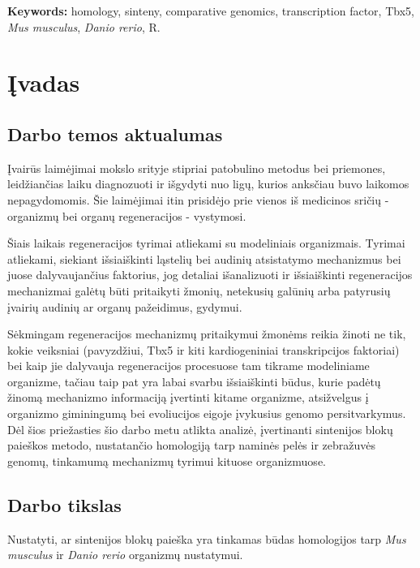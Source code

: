 \documentclass[12pt]{article}
\begin{document}
\hfill \break

\textbf{Keywords:} homology, sinteny, comparative genomics, transcription
factor, Tbx5, \emph{Mus musculus}, \emph{Danio rerio}, R.

\newpage


\section{Įvadas}
\subsection*{Darbo temos aktualumas}
Įvairūs laimėjimai mokslo srityje stipriai patobulino metodus bei priemones,
leidžiančias laiku diagnozuoti ir išgydyti nuo ligų, kurios anksčiau buvo
laikomos nepagydomomis. Šie laimėjimai itin prisidėjo prie vienos iš medicinos
sričių - organizmų bei organų regeneracijos - vystymosi.

Šiais laikais regeneracijos tyrimai atliekami su modeliniais organizmais.
Tyrimai atliekami, siekiant išsiaiškinti ląstelių bei audinių atsistatymo
mechanizmus bei juose dalyvaujančius faktorius, jog detaliai išanalizuoti ir
išsiaiškinti regeneracijos mechanizmai galėtų būti pritaikyti žmonių, netekusių
galūnių arba patyrusių įvairių audinių ar organų pažeidimus, gydymui.

Sėkmingam regeneracijos mechanizmų pritaikymui žmonėms reikia žinoti ne tik,
kokie veiksniai (pavyzdžiui, Tbx5 ir kiti kardiogeniniai transkripcijos
faktoriai) bei kaip jie dalyvauja regeneracijos procesuose tam tikrame
modeliniame organizme, tačiau taip pat yra labai svarbu išsiaiškinti būdus,
kurie padėtų žinomą mechanizmo informaciją įvertinti kitame organizme,
atsižvelgus į organizmo giminingumą bei evoliucijos eigoje įvykusius genomo
persitvarkymus. Dėl šios priežasties šio darbo metu atlikta analizė, įvertinanti
sintenijos blokų paieškos metodo, nus\-ta\-tan\-čio homologiją tarp naminės pelės
ir zebražuvės genomų, tinkamumą mechanizmų tyrimui kituose organizmuose.

\subsection*{Darbo tikslas}
Nustatyti, ar sintenijos blokų paieška yra tinkamas būdas homologijos tarp
\emph{Mus musculus} ir \emph{Danio rerio} organizmų nustatymui.
\end{document}
